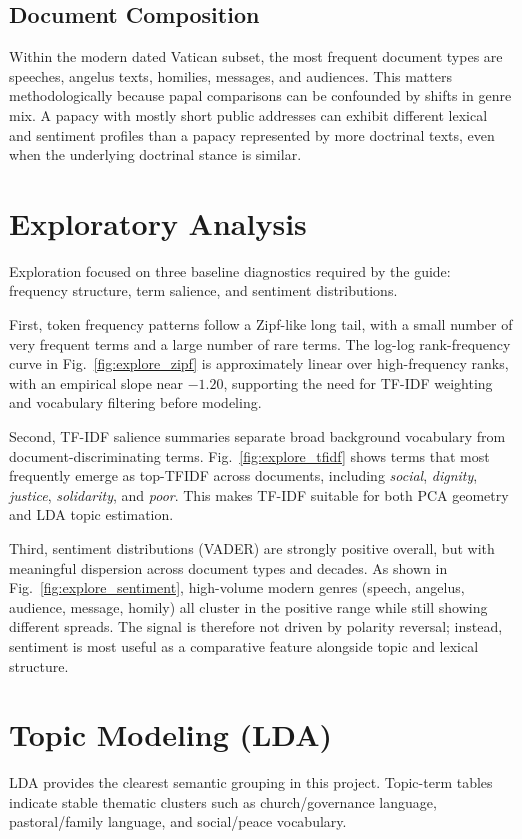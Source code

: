 \documentclass[conference]{IEEEtran}
\begin{document}
\subsection{Document Composition}
Within the modern dated Vatican subset, the most frequent document types are speeches, angelus texts, homilies, messages, and audiences. This matters methodologically because papal comparisons can be confounded by shifts in genre mix. A papacy with mostly short public addresses can exhibit different lexical and sentiment profiles than a papacy represented by more doctrinal texts, even when the underlying doctrinal stance is similar.

\section{Exploratory Analysis}
Exploration focused on three baseline diagnostics required by the guide: frequency structure, term salience, and sentiment distributions.

First, token frequency patterns follow a Zipf-like long tail, with a small number of very frequent terms and a large number of rare terms. The log-log rank-frequency curve in Fig.~\ref{fig:explore_zipf} is approximately linear over high-frequency ranks, with an empirical slope near $-1.20$, supporting the need for TF-IDF weighting and vocabulary filtering before modeling.

Second, TF-IDF salience summaries separate broad background vocabulary from document-discriminating terms. Fig.~\ref{fig:explore_tfidf} shows terms that most frequently emerge as top-TFIDF across documents, including \textit{social}, \textit{dignity}, \textit{justice}, \textit{solidarity}, and \textit{poor}. This makes TF-IDF suitable for both PCA geometry and LDA topic estimation.

Third, sentiment distributions (VADER) are strongly positive overall, but with meaningful dispersion across document types and decades. As shown in Fig.~\ref{fig:explore_sentiment}, high-volume modern genres (speech, angelus, audience, message, homily) all cluster in the positive range while still showing different spreads. The signal is therefore not driven by polarity reversal; instead, sentiment is most useful as a comparative feature alongside topic and lexical structure.

\section{Topic Modeling (LDA)}
LDA provides the clearest semantic grouping in this project. Topic-term tables indicate stable thematic clusters such as church/governance language, pastoral/family language, and social/peace vocabulary.
\end{document}
